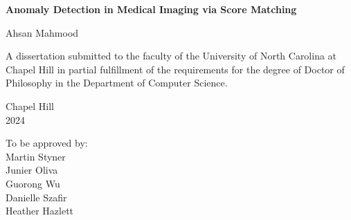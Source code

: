 \begin{titlepage}
\begin{center}


\vspace{2in}
\begin{singlespace}
\bf
Anomaly Detection in Medical Imaging via Score Matching
\end{singlespace}


\vspace{61pt} %
\large Ahsan Mahmood
\end{center}



\vspace{50pt}
\begin{singlespace}
\noindent \large
A dissertation submitted to the faculty of the University of North Carolina at Chapel Hill
in partial fulfillment of the requirements for the degree of Doctor of Philosophy in
the Department of Computer Science.
\end{singlespace}


\vspace{50pt}
\begin{center}
\begin{singlespace} \large
Chapel Hill\\
2024
\end{singlespace}
\end{center}


\vfill
\begin{flushright}
\begin{minipage}[t]{1.5in} \large
To be approved by: \\
Martin Styner \\
Junier Oliva \\
Guorong Wu \\
Danielle Szafir \\
Heather Hazlett
\end{minipage}
\end{flushright}

\end{titlepage}

